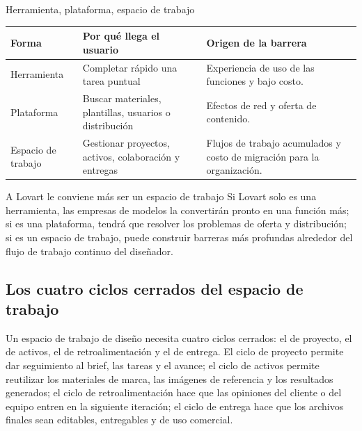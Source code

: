 \documentclass[a4paper]{article}
\begin{document}
\begin{knowledgebox}{Herramienta, plataforma, espacio de trabajo}
\begin{tabularx}{\textwidth}{p{}p{}X}
\toprule
Forma & Por qué llega el usuario & Origen de la barrera \\
\midrule
Herramienta & Completar rápido una tarea puntual & Experiencia de uso de las funciones y bajo costo. \\
Plataforma & Buscar materiales, plantillas, usuarios o distribución & Efectos de red y oferta de contenido. \\
Espacio de trabajo & Gestionar proyectos, activos, colaboración y entregas & Flujos de trabajo acumulados y costo de migración para la organización. \\
\bottomrule
\end{tabularx}
\end{knowledgebox}

\begin{importantbox}{A Lovart le conviene más ser un espacio de trabajo}
Si Lovart solo es una herramienta, las empresas de modelos la convertirán pronto en una función más; si es una plataforma, tendrá que resolver los problemas de oferta y distribución; si es un espacio de trabajo, puede construir barreras más profundas alrededor del flujo de trabajo continuo del diseñador.
\end{importantbox}

\subsection{Los cuatro ciclos cerrados del espacio de trabajo}

Un espacio de trabajo de diseño necesita cuatro ciclos cerrados: el de proyecto, el de activos, el de retroalimentación y el de entrega. El ciclo de proyecto permite dar seguimiento al brief, las tareas y el avance; el ciclo de activos permite reutilizar los materiales de marca, las imágenes de referencia y los resultados generados; el ciclo de retroalimentación hace que las opiniones del cliente o del equipo entren en la siguiente iteración; el ciclo de entrega hace que los archivos finales sean editables, entregables y de uso comercial.
\end{document}
